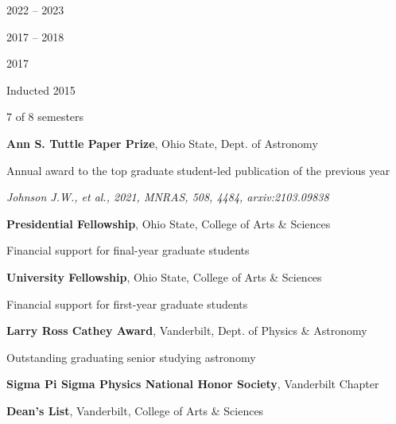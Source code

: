 \documentclass[cv.tex]{subfiles}
\begin{document}
\parbox{0.18\textwidth}{%
	 \par
	\null \par
	\null \par
	2022 -- 2023 \par
	\null \par
	2017 -- 2018 \par
	\null \par
	2017 \par
	\null \par
	Inducted 2015 \par
	7 of 8 semesters
}
\hspace{1mm}
\parbox{0.8\textwidth}{%
	\vspace{1mm}
	\textbf{Ann S. Tuttle Paper Prize}, Ohio State, Dept. of Astronomy \par
	Annual award to the top graduate student-led publication of the previous
	year \par
	\textit{Johnson J.W., et al., 2021, MNRAS, 508, 4484, arxiv:2103.09838} \par
	\textbf{Presidential Fellowship}, Ohio State, College of Arts \& Sciences
	\par
	Financial support for final-year graduate students \par
	\textbf{University Fellowship}, Ohio State, College of Arts \& Sciences \par
	Financial support for first-year graduate students \par
	\textbf{Larry Ross Cathey Award}, Vanderbilt, Dept. of Physics \& Astronomy
	\par
	Outstanding graduating senior studying astronomy \par
	\textbf{Sigma Pi Sigma Physics National Honor Society}, Vanderbilt Chapter
	\par
	\textbf{Dean's List}, Vanderbilt, College of Arts \& Sciences
}
\end{document}
